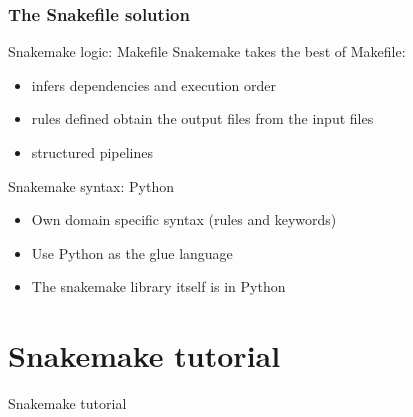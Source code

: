 \documentclass{beamer}
\begin{document}
\begin{frame}
 \frametitle{The Snakefile solution}
 \begin{block}{Snakemake logic: Makefile }
  Snakemake takes the best of Makefile: 
  \begin{itemize}
      \item infers dependencies and execution order
      \item rules defined obtain the output files from the input files
      \item structured pipelines
  \end{itemize}
  \end{block}
  \begin{block}{Snakemake syntax: Python}
  \begin{itemize}
  \item Own domain specific syntax (rules and keywords)
  \item Use Python as the glue language
  \item The snakemake library itself is in Python
  \end{itemize}
  \end{block} 
\end{frame}


\section{Snakemake tutorial}

\begin{frame}[plain]
 \centering
 \begin{Huge}
 Snakemake tutorial
 \end{Huge}
\end{frame}

\end{document}
